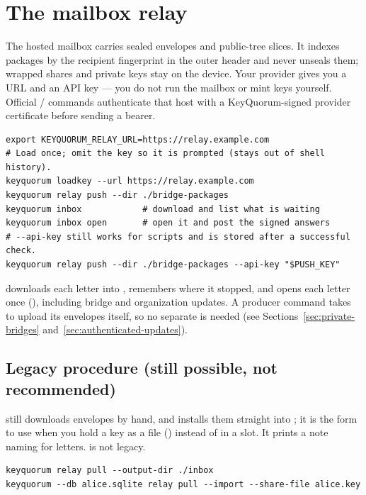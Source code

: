 \section{The mailbox relay}
\label{sec:mailbox-relay}

The hosted mailbox carries sealed  envelopes and public-tree
slices. It indexes packages by the recipient fingerprint in the outer
header and never unseals them; wrapped shares and private keys stay on the
device. Your provider gives you a URL and an API key --- you do not run the
mailbox or mint keys yourself. Official  / 
commands authenticate that host with a KeyQuorum-signed provider
certificate before sending a bearer.

\begin{lstlisting}
export KEYQUORUM_RELAY_URL=https://relay.example.com
# Load once; omit the key so it is prompted (stays out of shell history).
keyquorum loadkey --url https://relay.example.com
keyquorum relay push --dir ./bridge-packages
keyquorum inbox            # download and list what is waiting
keyquorum inbox open       # open it and post the signed answers
# --api-key still works for scripts and is stored after a successful check.
keyquorum relay push --dir ./bridge-packages --api-key "$PUSH_KEY"
\end{lstlisting}

 downloads each letter into , remembers
where it stopped, and opens each letter once (), including
bridge and organization updates. A producer command takes  to
upload its envelopes itself, so no separate  is needed (see
Sections~\ref{sec:private-bridges} and~\ref{sec:authenticated-updates}).

\subsection{Legacy procedure (still possible, not recommended)}

 still downloads envelopes by hand, and 
installs them straight into ; it is the form to use when you hold a
key as a file () instead of in a slot. It prints a note
naming  for letters.  is not legacy.

\begin{lstlisting}
keyquorum relay pull --output-dir ./inbox
keyquorum --db alice.sqlite relay pull --import --share-file alice.key
\end{lstlisting}

